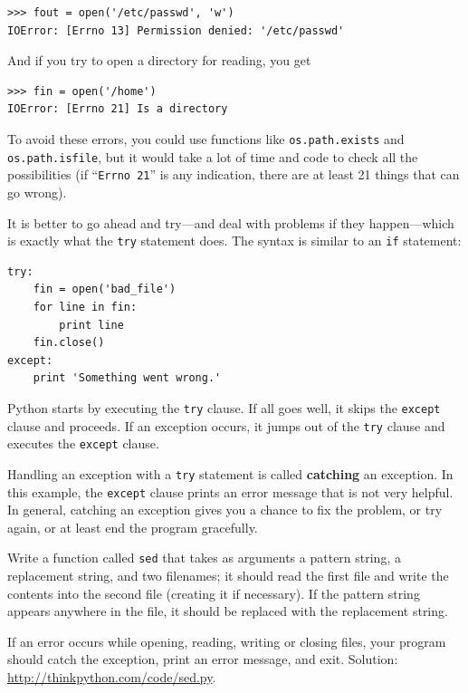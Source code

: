 \documentclass[10pt]{book}
\begin{document}
\begin{CJK}{UTF8}{gbsn}
\begin{verbatim}
>>> fout = open('/etc/passwd', 'w')
IOError: [Errno 13] Permission denied: '/etc/passwd'
\end{verbatim}
%
And if you try to open a directory for reading, you get

\begin{verbatim}
>>> fin = open('/home')
IOError: [Errno 21] Is a directory
\end{verbatim}
%
To avoid these errors, you could use functions like {\tt os.path.exists}
and {\tt os.path.isfile}, but it would take a lot of time and code
to check all the possibilities (if ``{\tt Errno 21}'' is any
indication, there are at least 21 things that can go wrong).

It is better to go ahead and try---and deal with problems if they
happen---which is exactly what the {\tt try} statement does.  The
syntax is similar to an {\tt if} statement:

\begin{verbatim}
try:    
    fin = open('bad_file')
    for line in fin:
        print line
    fin.close()
except:
    print 'Something went wrong.'
\end{verbatim}
%
Python starts by executing the {\tt try} clause.  If all goes
well, it skips the {\tt except} clause and proceeds.  If an
exception occurs, it jumps out of the {\tt try} clause and
executes the {\tt except} clause.

Handling an exception with a {\tt try} statement is called {\bf
catching} an exception.  In this example, the {\tt except} clause
prints an error message that is not very helpful.  In general,
catching an exception gives you a chance to fix the problem, or try
again, or at least end the program gracefully.

\begin{exercise}

Write a function called {\tt sed} that takes as arguments a pattern string,
a replacement string, and two filenames; it should read the first file
and write the contents into the second file (creating it if
necessary).  If the pattern string appears anywhere in the file, it
should be replaced with the replacement string.

If an error occurs while opening, reading, writing or closing files,
your program should catch the exception, print an error message, and
exit.  Solution: \url{http://thinkpython.com/code/sed.py}.


\end{exercise}
\end{CJK}
\end{document}
